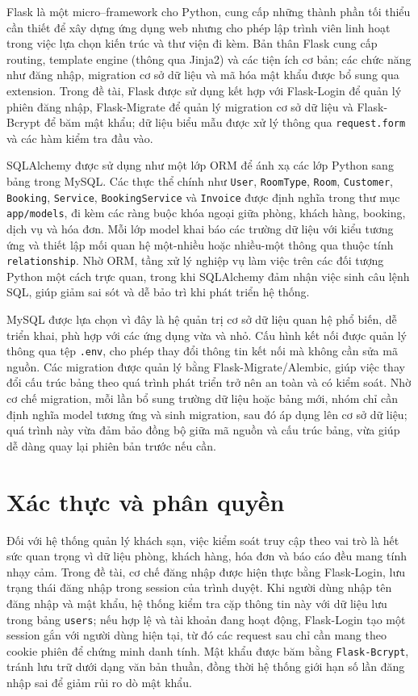 \documentclass[13pt,a4paper]{extreport}
\begin{document}
Flask là một micro–framework cho Python, cung cấp những thành phần tối thiểu cần thiết để xây dựng ứng dụng web nhưng cho phép lập trình viên linh hoạt trong việc lựa chọn kiến trúc và thư viện đi kèm. Bản thân Flask cung cấp routing, template engine (thông qua Jinja2) và các tiện ích cơ bản; các chức năng như đăng nhập, migration cơ sở dữ liệu và mã hóa mật khẩu được bổ sung qua extension. Trong đề tài, Flask được sử dụng kết hợp với Flask-Login để quản lý phiên đăng nhập, Flask-Migrate để quản lý migration cơ sở dữ liệu và Flask-Bcrypt để băm mật khẩu; dữ liệu biểu mẫu được xử lý thông qua \texttt{request.form} và các hàm kiểm tra đầu vào.

SQLAlchemy được sử dụng như một lớp ORM để ánh xạ các lớp Python sang bảng trong MySQL. Các thực thể chính như \texttt{User}, \texttt{RoomType}, \texttt{Room}, \texttt{Customer}, \texttt{Booking}, \texttt{Service}, \texttt{BookingService} và \texttt{Invoice} được định nghĩa trong thư mục \texttt{app/models}, đi kèm các ràng buộc khóa ngoại giữa phòng, khách hàng, booking, dịch vụ và hóa đơn. Mỗi lớp model khai báo các trường dữ liệu với kiểu tương ứng và thiết lập mối quan hệ một-nhiều hoặc nhiều-một thông qua thuộc tính \texttt{relationship}. Nhờ ORM, tầng xử lý nghiệp vụ làm việc trên các đối tượng Python một cách trực quan, trong khi SQLAlchemy đảm nhận việc sinh câu lệnh SQL, giúp giảm sai sót và dễ bảo trì khi phát triển hệ thống.

MySQL được lựa chọn vì đây là hệ quản trị cơ sở dữ liệu quan hệ phổ biến, dễ triển khai, phù hợp với các ứng dụng vừa và nhỏ. Cấu hình kết nối được quản lý thông qua tệp \texttt{.env}, cho phép thay đổi thông tin kết nối mà không cần sửa mã nguồn. Các migration được quản lý bằng Flask-Migrate/Alembic, giúp việc thay đổi cấu trúc bảng theo quá trình phát triển trở nên an toàn và có kiểm soát. Nhờ cơ chế migration, mỗi lần bổ sung trường dữ liệu hoặc bảng mới, nhóm chỉ cần định nghĩa model tương ứng và sinh migration, sau đó áp dụng lên cơ sở dữ liệu; quá trình này vừa đảm bảo đồng bộ giữa mã nguồn và cấu trúc bảng, vừa giúp dễ dàng quay lại phiên bản trước nếu cần.

\section{Xác thực và phân quyền}

Đối với hệ thống quản lý khách sạn, việc kiểm soát truy cập theo vai trò là hết sức quan trọng vì dữ liệu phòng, khách hàng, hóa đơn và báo cáo đều mang tính nhạy cảm. Trong đề tài, cơ chế đăng nhập được hiện thực bằng Flask-Login, lưu trạng thái đăng nhập trong session của trình duyệt. Khi người dùng nhập tên đăng nhập và mật khẩu, hệ thống kiểm tra cặp thông tin này với dữ liệu lưu trong bảng \texttt{users}; nếu hợp lệ và tài khoản đang hoạt động, Flask-Login tạo một session gắn với người dùng hiện tại, từ đó các request sau chỉ cần mang theo cookie phiên để chứng minh danh tính. Mật khẩu được băm bằng \texttt{Flask-Bcrypt}, tránh lưu trữ dưới dạng văn bản thuần, đồng thời hệ thống giới hạn số lần đăng nhập sai để giảm rủi ro dò mật khẩu.
\end{document}
